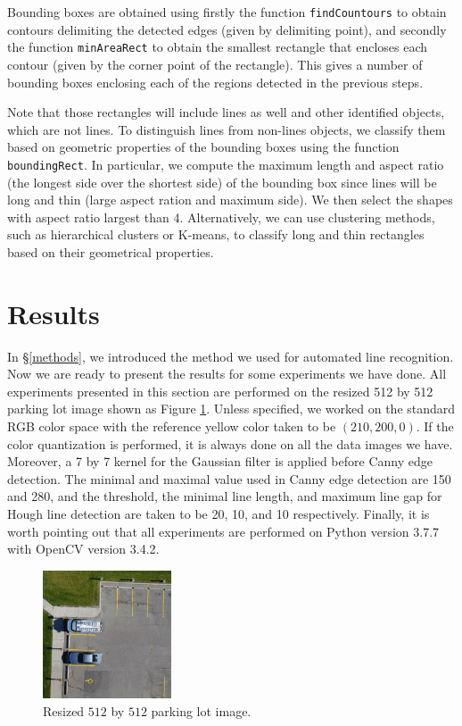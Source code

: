 \documentclass{m2pi}
\begin{document}
Bounding boxes are obtained using firstly the function \verb+findCountours+ to obtain contours delimiting the detected edges (given by delimiting point), and secondly the function \verb+minAreaRect+ to obtain the smallest rectangle that encloses each contour (given by the corner point of the rectangle). This gives a number of bounding boxes enclosing each of the regions detected in the previous steps. 

Note that those rectangles will include lines as well and other identified objects, which are not lines. To distinguish lines from non-lines objects, we classify them based on geometric properties of the bounding boxes using the function \verb+boundingRect+. In particular, we compute the maximum length and aspect ratio (the longest side over the shortest side) of the bounding box since lines will be long and thin (large aspect ration and maximum side). We then select the shapes with aspect ratio largest than 4. Alternatively, we can use clustering methods, such as hierarchical clusters or K-means, to classify long and thin rectangles based on their geometrical properties.

\section{Results}\label{results}
In \S \ref{methods}, we introduced the method we used for automated 
line recognition. Now we are ready to present the results for some experiments
we have done. 
All experiments presented in this section are performed on the resized 512 
by 512 parking lot image shown as Figure \ref{lot1}. Unless specified, we 
worked on the standard RGB  color space with the reference 
yellow color taken to be $(210, 200, 0)$. If the color quantization is 
performed, it is always done on all the data images we have. Moreover, 
a 7 by 7 kernel for the Gaussian filter is applied before Canny edge
detection. The minimal and maximal value used in Canny edge 
detection are 150 and 280, and the threshold, the minimal line length, and 
maximum line gap for Hough line detection are taken to be 20, 10, and 10 respectively.
Finally, it is worth pointing out that all experiments are performed on 
Python version 3.7.7 with OpenCV version 3.4.2.

\begin{figure}[htp]
\centering
\includegraphics[width=3.8cm]{figures/Resized_Lot1.jpg}
\caption{Resized $512$ by $512$ parking lot image.}
\label{lot1}
\end{figure}
\end{document}

